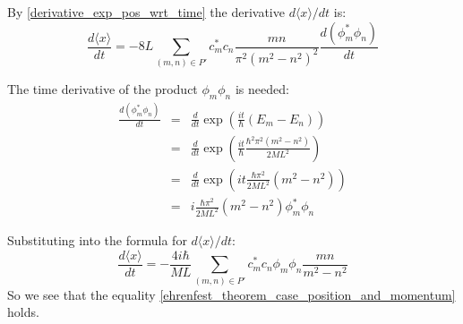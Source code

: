 \documentclass[12pt]{article}
\begin{document}
\noindent By \eqref{derivative_exp_pos_wrt_time} the derivative $d\langle x \rangle / dt$ is:
\begin{equation}
\frac{d \langle x \rangle}{dt} = 
-8L \sum_{(m,n) \in P'} c_m^* c_n  \frac{mn}{\pi^2(m^2-n^2)^2} \frac{d (\phi_m^* \phi_n)}{dt}
\end{equation}

\noindent The time derivative of the product $\phi_m \phi_n$ is needed:
\begin{eqnarray*}
\frac{d(\phi_m^* \phi_n)}{dt} &=& \frac{d}{dt} \exp \left( \frac{it}{\hbar}(E_m - E_n) \right) \\
		&=& \frac{d}{dt} \exp \left( \frac{it}{\hbar} \frac{\hbar^2 \pi^2 (m^2 - n^2)}{2M L^2}  \right)\\
		&=& \frac{d}{dt} \exp \left( it \frac{\hbar \pi^2}{2M L^2}(m^2 - n^2)  \right) \\
		&=& i \frac{\hbar \pi^2}{2M L^2}(m^2 - n^2)  \phi_m^* \phi_n
\end{eqnarray*}



\noindent Substituting into the formula for $d \langle x \rangle / dt$:
\begin{equation}
\frac{d \langle x \rangle}{dt} = 
- \frac{4i \hbar }{M L} \sum_{(m,n) \in P'} c_m^* c_n \phi_m \phi_n \frac{mn}{m^2 - n^2}
\end{equation}
So we see that the equality \eqref{ehrenfest_theorem_case_position_and_momentum} holds.
\end{document}
